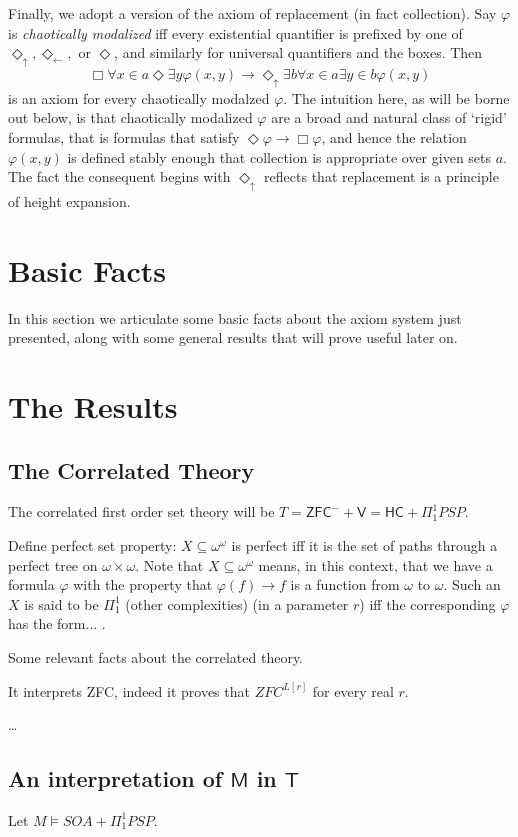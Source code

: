\documentclass{article}
\theoremstyle{definition}
\newcommand{\du}{\Diamond_\uparrow}
\newcommand{\dl}{\Diamond_\leftarrow}
\begin{document}
Finally, we adopt a version of the axiom of replacement (in fact collection). Say $\varphi$ is \emph{chaotically modalized}
iff every existential quantifier is prefixed by one of $\du, \dl,$ or $\Diamond$, and similarly for 
universal quantifiers and the boxes. Then 
\[\Box \forall x \in a \Diamond \exists y \varphi (x, y) 
\rightarrow \du \exists b \forall x \in a \exists y \in b \varphi(x, y)\]
is an axiom for every chaotically modalzed $\varphi$. The intuition here, as will be borne out 
below, is that chaotically modalized $\varphi$ are a broad and natural class of `rigid' formulas,
that is formulas that satisfy $\Diamond \varphi \rightarrow \Box \varphi$, and hence the 
relation $\varphi(x, y)$ is defined stably enough that collection is appropriate over given sets $a$.
The fact the consequent begins with $\du$ reflects that replacement is a principle of height expansion.

\section{Basic Facts}
In this section we articulate some basic facts about the axiom system just presented, 
along with some general results that will prove useful later on.


\section{The Results}
\subsection{The Correlated Theory}
The correlated first order set theory will be 
$T = \mathsf{ZFC}^- + \mathsf{V = HC} + \Pi^1_1 PSP$. 

Define perfect set property: $X \subseteq \omega^\omega$ is perfect iff it is 
the set of paths through a perfect tree on $\omega \times \omega$. Note that 
$X \subseteq \omega^\omega$ means, in this context, that we have a formula 
$\varphi$ with the property that $\varphi(f) \rightarrow f$ is a function from 
$\omega$ to $\omega$. Such an $X$ is said to be $\Pi^1_1$ (other complexities)
 (in a parameter $r$) iff the 
corresponding $\varphi$ has the form... .

Some relevant facts about the correlated theory.

It interprets ZFC, indeed it proves that $ZFC^{L[r]}$ for every real $r$.

\dots

\subsection{An interpretation of $\mathsf{M}$ in $\mathsf{T}$}
 Let $M \vDash SOA + \Pi_1^1 PSP$.
\end{document}
